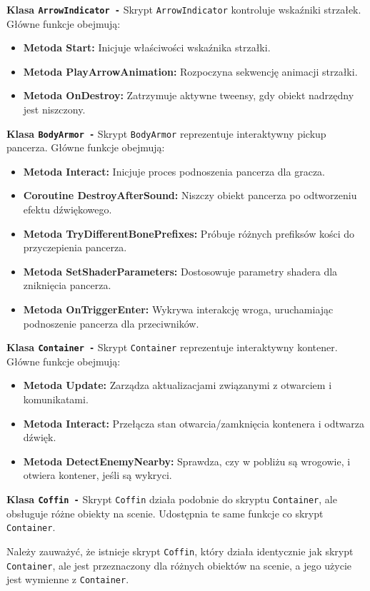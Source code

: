 \textbf{Klasa \texttt{ArrowIndicator -}}
Skrypt \texttt{ArrowIndicator} kontroluje wskaźniki strzałek. Główne funkcje obejmują:
\begin{itemize}
  \item \textbf{Metoda Start:} Inicjuje właściwości wskaźnika strzałki.
  \item \textbf{Metoda PlayArrowAnimation:} Rozpoczyna sekwencję animacji strzałki.
  \item \textbf{Metoda OnDestroy:} Zatrzymuje aktywne tweensy, gdy obiekt nadrzędny jest niszczony.
\end{itemize}

\textbf{Klasa \texttt{BodyArmor -}}
Skrypt \texttt{BodyArmor} reprezentuje interaktywny pickup pancerza. Główne funkcje obejmują:
\begin{itemize}
  \item \textbf{Metoda Interact:} Inicjuje proces podnoszenia pancerza dla gracza.
  \item \textbf{Coroutine DestroyAfterSound:} Niszczy obiekt pancerza po odtworzeniu efektu dźwiękowego.
  \item \textbf{Metoda TryDifferentBonePrefixes:} Próbuje różnych prefiksów kości do przyczepienia pancerza.
  \item \textbf{Metoda SetShaderParameters:} Dostosowuje parametry shadera dla zniknięcia pancerza.
  \item \textbf{Metoda OnTriggerEnter:} Wykrywa interakcję wroga, uruchamiając podnoszenie pancerza dla przeciwników.
\end{itemize}

\textbf{Klasa \texttt{Container -}}
Skrypt \texttt{Container} reprezentuje interaktywny kontener. Główne funkcje obejmują:
\begin{itemize}
  \item \textbf{Metoda Update:} Zarządza aktualizacjami związanymi z otwarciem i komunikatami.
  \item \textbf{Metoda Interact:} Przełącza stan otwarcia/zamknięcia kontenera i odtwarza dźwięk.
  \item \textbf{Metoda DetectEnemyNearby:} Sprawdza, czy w pobliżu są wrogowie, i otwiera kontener, jeśli są wykryci.
\end{itemize}

\textbf{Klasa \texttt{Coffin -}}
Skrypt \texttt{Coffin} działa podobnie do skryptu \texttt{Container}, ale obsługuje różne obiekty na scenie. Udostępnia te same funkcje co skrypt \texttt{Container}.

Należy zauważyć, że istnieje skrypt \texttt{Coffin}, który działa identycznie jak skrypt \texttt{Container}, ale jest przeznaczony dla różnych obiektów na scenie, a jego użycie jest wymienne z \texttt{Container}.

